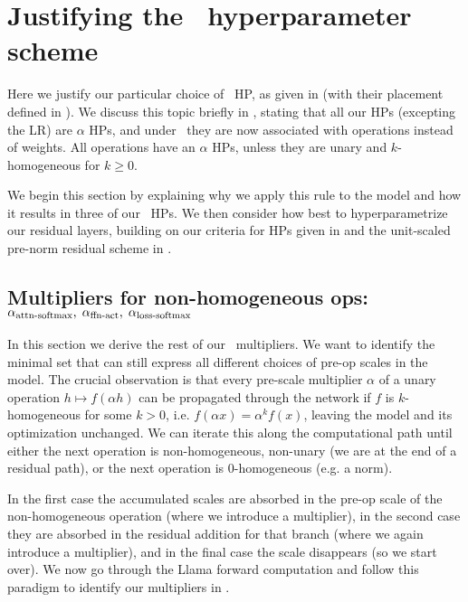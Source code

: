 \section{Justifying the \umup\ hyperparameter scheme} \label{sec:umup_hparams}

Here we justify our particular choice of \umup\ HP, as given in  (with their placement defined in ). We discuss this topic briefly in , stating that all our HPs (excepting the LR) are $\alpha$ HPs, and under \umup\ they are now associated with operations instead of weights. All operations have an $\alpha$ HPs, unless they are unary and $k$-homogeneous for $k \ge 0$.

We begin this section by explaining why we apply this rule to the model and how it results in three of our \umup\ HPs. We then consider how best to hyperparametrize our residual layers, building on our criteria for HPs given in  and the unit-scaled pre-norm residual scheme in .






\subsection{Multipliers for non-homogeneous ops: $\alpha_{\mathrm{attn{\text -}softmax}},\; \alpha_{\mathrm{ffn{\text -}act}},\; \alpha_{\mathrm{loss{\text -}softmax}}$} \label{app:non-homogeneous}

In this section we derive the rest of our \umup\ multipliers. We want to identify the minimal set that can still express all different choices of pre-op scales in the model. The crucial observation is that every pre-scale multiplier $\alpha$ of a unary operation $h \mapsto f(\alpha h)$ can be propagated through the network if $f$ is $k$-homogeneous for some $k>0$, i.e. $f(\alpha x) = \alpha^k f(x)$, leaving the model and its optimization unchanged. We can iterate this along the computational path until either the next operation is non-homogeneous, non-unary (we are at the end of a residual path), or the next operation is 0-homogeneous (e.g. a norm).

In the first case the accumulated scales are absorbed in the pre-op scale of the non-homogeneous operation (where we introduce a multiplier), in the second case they are absorbed in the residual addition for that branch (where we again introduce a multiplier), and in the final case the scale disappears (so we start over). We now go through the Llama forward computation and follow this paradigm to identify our multipliers in .

